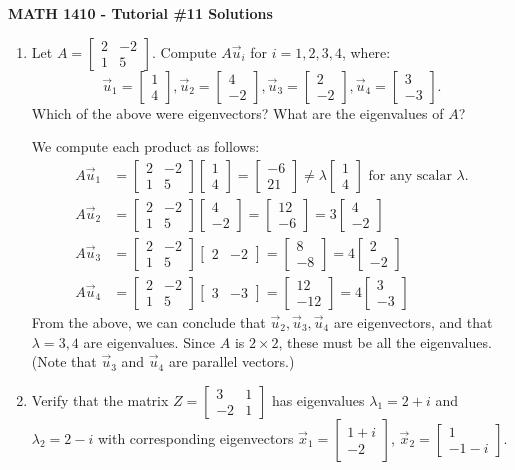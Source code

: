 \documentclass[12pt]{article}
\newcommand{\bbm}{\begin{bmatrix}}
\newcommand{\ebm}{\end{bmatrix}}
\begin{document}
\author{Instructor: Sean Fitzpatrick}
\thispagestyle{empty}
\begin{center}
{\bf MATH 1410 - Tutorial \#11 Solutions}
\end{center}
 \begin{enumerate}
 
\item Let $A = \bbm 2&-2\\1&5\ebm$. Compute $A\vec{u}_i$ for $i=1,2,3,4$, where:
\[
\vec{u}_1 =  \bbm 1\\4\ebm, \vec{u}_2 = \bbm 4\\-2\ebm, \vec{u}_3 = \bbm 2\\-2\ebm, \vec{u}_4 = \bbm 3\\-3\ebm.
\]
Which of the above were eigenvectors? What are the eigenvalues of $A$?

We compute each product as follows:
\begin{align*}
A\vec{u}_1 & = \bbm 2&-2\\1&5\ebm\bbm 1\\4\ebm = \bbm -6\\21\ebm \neq \lambda \bbm 1\\4\ebm \text{ for any scalar } \lambda.\\
A\vec{u}_2 & = \bbm 2&-2\\1&5\ebm\bbm 4\\-2\ebm = \bbm 12\\-6\ebm = 3\bbm 4\\-2\ebm\\
A\vec{u}_3 & = \bbm 2&-2\\1&5\ebm\bbm 2&-2\ebm = \bbm 8\\-8\ebm = 4\bbm 2\\-2\ebm\\
A\vec{u}_4 & = \bbm 2&-2\\1&5\ebm\bbm 3&-3\ebm = \bbm 12\\-12\ebm = 4\bbm 3\\-3\ebm
\end{align*}
From the above, we can conclude that $\vec{u}_2,\vec{u}_3,\vec{u}_4$ are eigenvectors, and that $\lambda =3,4$ are eigenvalues. Since $A$ is $2\times 2$, these must be all the eigenvalues. (Note that $\vec{u}_3$ and $\vec{u}_4$ are parallel vectors.)

\item Verify that the matrix $Z = \bbm 3&1\\-2&1\ebm$ has eigenvalues $\lambda_1 = 2 + i$ and $\lambda_2=2-i$ with corresponding eigenvectors $\vec{x}_1 = \bbm 1+i\\-2\ebm$, $\vec{x}_2 = \bbm 1\\-1-i\ebm$.


\end{enumerate}
\end{document}
